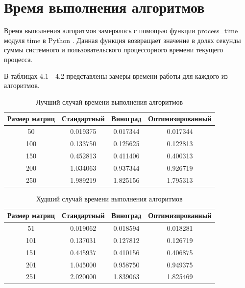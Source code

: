 \documentclass[12pt]{report}
\begin{document}
	\section{Время выполнения алгоритмов}
	Время выполнения алгоритмов замерялось с помощью функции process\_time модуля time в Python  \cite{process}. Данная функция возвращает значение в долях секунды суммы системного и пользовательского процессорного времени текущего процесса. \newline
	
	В таблицах 4.1 - 4.2 представлены замеры времени работы для каждого из алгоритмов.
	
	\begin{table} [h!]
		\caption{Лучший случай времени выполнения алгоритмов}
		\begin{center}
			\begin{tabular}{|c c c c|} 
				\hline
				Размер матриц & Стандартный & Виноград & Оптимизированный \\  
				\hline
				50 & 0.019375 & 0.017344 & 0.017344 \\
				\hline
				100 & 0.133750 & 0.125625 & 0.122813 \\
				\hline
				150 & 0.452813 & 0.411406 & 0.400313 \\
				\hline
				200 & 1.034063 & 0.937344 & 0.926719 \\
				\hline
				250 & 1.989219 & 1.825156 & 1.795313 \\
				\hline
			\end{tabular}
		\end{center}
	\end{table}

	\begin{table} [h!]
		\caption{Худший случай времени выполнения алгоритмов}
		\begin{center}
			\begin{tabular}{|c c c c|} 
				\hline
				Размер матриц & Стандартный & Виноград & Оптимизированный \\  
				\hline
				51 & 0.019062 & 0.018594 & 0.018281 \\
				\hline
				101 & 0.137031 & 0.127812 & 0.126719 \\
				\hline
				151 & 0.445937 & 0.410156 & 0.406875 \\
				\hline
				201 & 1.045000 & 0.958750 & 0.949375 \\
				\hline
				251 & 2.020000 & 1.839063 & 1.825469 \\
				\hline
			\end{tabular}
		\end{center}
	\end{table}
	
\end{document}
